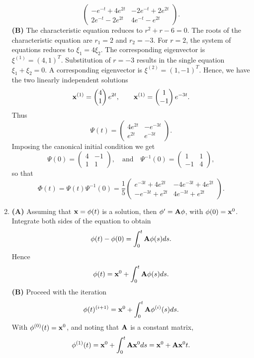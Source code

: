 \documentclass[11pt,a4paper]{article}
\begin{document}
\begin{enumerate}
$$\begin{pmatrix}
			-e^{-t} + 4e^{2t} & -2e^{-t} + 2e^{2t}\\
			2e^{-t}-2e^{2t} & 4e^{-t} - e^{2t}
		\end{pmatrix}.
		$$
		\textbf{(B)} The characteristic equation reduces to $r^2 + r - 6 = 0$. The roots of the characteristic equation are $r_1 = 2$ and $r_2 = -3$. For $r = 2$, the system of equations reduces to $\xi_1 = 4\xi_2$. The corresponding eigenvector is $\xi^{(1)} = (4, 1)^T$. Substitution of $r = -3$ results in the single equation $\xi_1 + \xi_2 = 0$. A corresponding eigenvector is $\xi^{(2)} = (1, -1)^T$. Hence, we have the two linearly independent solutions
		$$
		\vb{x}^{(1)} =
		\begin{pmatrix}
			4\\
			1
		\end{pmatrix}e^{2t},\qquad \vb{x}^{(1)} =
		\begin{pmatrix}
			1\\
			-1
		\end{pmatrix}e^{-3t}.
		$$
		Thus
		$$
		\Psi(t) =
		\begin{pmatrix}
			4e^{2t} & -e^{-3t}\\
			e^{2t} & e^{-3t}
		\end{pmatrix}.
		$$
		Imposing the canonical initial condition we get
		$$
		\Psi(0) =
		\begin{pmatrix}
			4 & -1\\
			1 & 1
		\end{pmatrix},\quad \text{and} \quad \Psi^{-1}(0) =
		\begin{pmatrix}
			1 & 1\\
			-1 & 4
		\end{pmatrix},
		$$
		so that
		$$
		\Phi(t) = \Psi(t)\Psi^{-1}(0) = \frac{1}{5}
		\begin{pmatrix}
			e^{-3t} + 4e^{2t} & -4e^{-3t} + 4e^{2t}\\
			-e^{-3t} + e^{2t} & 4e^{-3t} + e^{2t}
		\end{pmatrix}.
		$$
		\item \textbf{(A)} Assuming that $\vb{x} = \phi(t)$ is a solution, then $\phi^\prime = \vb{A}\phi$, with $\phi(0) = \vb{x}^0$. Integrate both sides of the equation to obtain
		$$
		\phi(t) - \phi(0) = \int_0^t \vb{A}\phi(s)ds.
		$$
		Hence
		$$
		\phi(t) = \vb{x}^0 + \int_0^t \vb{A}\phi(s)ds.
		$$
		\textbf{(B)} Proceed with the iteration
		$$
		\phi(t)^{(i+1)} = \vb{x}^0 + \int_0^t \vb{A}\phi^{(i)}(s)ds.
		$$
		With $\phi^{(0)}(t) = \vb{x}^0$, and noting that $\vb{A}$ is a constant matrix,
		$$
		\phi^{(1)}(t) = \vb{x}^0 + \int_0^t \vb{A}\vb{x}^0ds = \vb{x}^0 + \vb{A}\vb{x}^0t.
$$
\end{enumerate}
\end{document}
